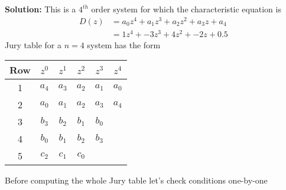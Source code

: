 \documentclass[twoside]{article}
\begin{document}
\textbf{Solution:} This is a $4^{th}$ order system for which the
characteristic equation is 
%
\begin{align*}
  D(z) &= a_0 z^4 + a_1 z^3 + a_2 z^2 + a_3 z +  a_4\\
         &= 1 z^4 + -3 z^3 + 4 z^2 + -2 z + 0.5
\end{align*}
%
Jury table for a $n=4$ system has the form
%
\begin{center}
  \begin{tabular}{ | c || c c c c c |}
    \hline
    Row & $z^0$ & $z^1$ & $z^2$ & $z^3 $ & $z^4$ \\ \hline \hline
    1 & $a_4$ & $a_3$ & $a_2$ & $a_1$ & $a_0$ \\ \hline
    2 & $a_0$ & $a_1$ & $a_2$ & $a_3$ & $a_4$ \\ \hline
    3 & $b_3$ & $b_2$ & $b_1$ & $b_0$ &  \\ \hline
    4 & $b_0$ & $b_1$ & $b_2$ & $b_3$ &  \\ \hline
    5 & $c_2$ & $c_1$ & $c_0$ &  &  \\ \hline
  \end{tabular}
\end{center}
%
Before computing the whole Jury table let's check conditions
one-by-one
%
\end{document}
